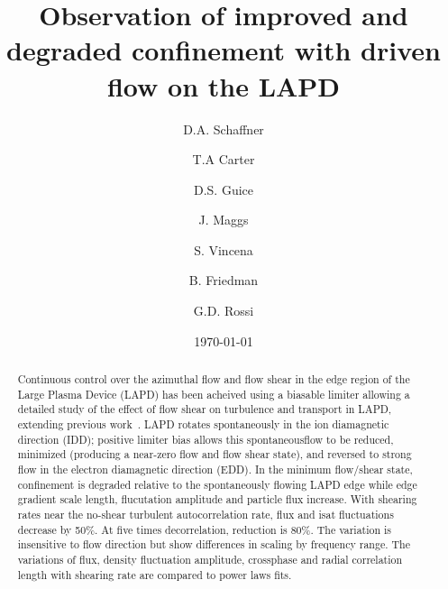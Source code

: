 \documentclass[%
 aps,
 prl,
 amsmath,amssymb,
 reprint,%
]{revtex4-1}
\begin{document}
\title{Observation of improved and degraded confinement with driven flow on the LAPD}
\author{D.A. Schaffner}
\author{T.A Carter}
\author{D.S. Guice}
\author{J. Maggs}
\author{S. Vincena}
\author{B. Friedman}
\author{G.D. Rossi}

\date{\today}%

\begin{abstract}
Continuous control over the azimuthal flow and flow shear in the edge region of the Large Plasma Device (LAPD) has been acheived using a biasable limiter allowing a detailed study of the effect of flow shear on turbulence and transport in LAPD, extending previous work~\cite{carter09}. LAPD rotates spontaneously in the ion diamagnetic direction (IDD); positive limiter bias allows this spontaneousflow to be reduced, minimized (producing a near-zero flow and flow
shear state), and reversed to strong flow in the electron diamagnetic direction (EDD). In the minimum flow/shear state, confinement is degraded relative to the spontaneously flowing LAPD edge while edge gradient scale length, flucutation amplitude and particle flux increase. With shearing rates near the no-shear turbulent autocorrelation rate, flux and isat fluctuations decrease by 50\%. At five times decorrelation, reduction is 80\%. The variation is insensitive to flow direction but show differences in scaling by frequency range. The variations of flux, density fluctuation amplitude, crossphase and radial correlation length with shearing rate are compared to power laws fits.
\end{abstract}

\maketitle

\end{document}
